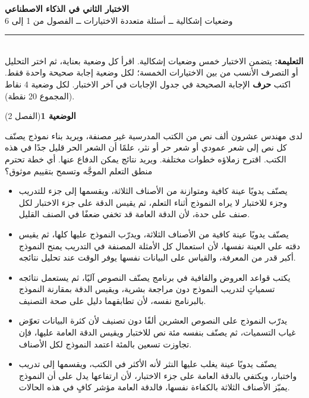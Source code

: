 \documentclass[11pt,a4paper]{article}
\begin{document}
\linespread{1.08}\selectfont
\begin{center}
{\LARGE\khatt\textbf{الاختبار الثاني في الذكاء الاصطناعي}}\\[4pt]
{\normalsize وضعيات إشكالية ــ أسئلة متعددة الاختيارات ــ الفصول من 1 إلى 6}
\end{center}
\vspace{-2pt}\rule{\textwidth}{0.6pt}\\[2pt]
\textbf{التعليمة:} يتضمن الاختبار خمس وضعيات إشكالية. اقرأ كل وضعية بعناية، ثم اختر التحليل أو التصرف الأنسب
من بين الاختيارات الخمسة؛ لكل وضعية إجابة صحيحة واحدة فقط.
اكتب \textbf{حرف} الإجابة الصحيحة في جدول الإجابات في آخر الاختبار.
لكل وضعية 4 نقاط (المجموع 20 نقطة).
\vspace{4pt}

\noindent
{\large\khatt\textbf{الوضعية 1}}\hfill{\small(الفصل 2)}\par\nopagebreak\vspace{3pt}
\setlength{\fboxsep}{7pt}\colorbox{gray!10}{\parbox{\dimexpr\linewidth-14pt}{لدى مهندس عشرون ألف نص من الكتب المدرسية غير مصنفة، ويريد بناء نموذج يصنّف كل نص إلى شعر عمودي أو شعر حر أو نثر، علمًا أن الشعر الحر قليل جدًا في هذه الكتب. اقترح زملاؤه خطوات مختلفة. ويريد نتائج يمكن الدفاع عنها. أي خطة تحترم منطق التعلم الموجَّه وتسمح بتقييم موثوق؟}}\par\nopagebreak
\begin{itemize}[leftmargin=1.0cm, labelsep=6pt, itemsep=3pt, topsep=4pt, parsep=0pt]
  \item[\textbf{أ)}] يصنّف يدويًا عينة كافية ومتوازنة من الأصناف الثلاثة، ويقسمها إلى جزء للتدريب وجزء للاختبار لا يراه النموذج أثناء التعلم، ثم يقيس الدقة على جزء الاختبار لكل صنف على حدة، لأن الدقة العامة قد تخفي ضعفًا في الصنف القليل.
  \item[\textbf{ب)}] يصنّف يدويًا عينة كافية من الأصناف الثلاثة، ويدرّب النموذج عليها كلها، ثم يقيس دقته على العينة نفسها، لأن استعمال كل الأمثلة المصنفة في التدريب يمنح النموذج أكبر قدر من المعرفة، والقياس على البيانات نفسها يوفر الوقت عند تحليل نتائجه.
  \item[\textbf{ج)}] يكتب قواعد العروض والقافية في برنامج يصنّف النصوص آليًا، ثم يستعمل نتائجه تسمياتٍ لتدريب النموذج دون مراجعة بشرية، ويقيس الدقة بمقارنة النموذج بالبرنامج نفسه، لأن تطابقهما دليل على صحة التصنيف.
  \item[\textbf{د)}] يدرّب النموذج على النصوص العشرين ألفًا دون تصنيف لأن كثرة البيانات تعوّض غياب التسميات، ثم يصنّف بنفسه مئة نص للاختبار ويقيس الدقة العامة عليها، فإن تجاوزت تسعين بالمئة اعتمد النموذج لكل الأصناف.
  \item[\textbf{هـ)}] يصنّف يدويًا عينة يغلب عليها النثر لأنه الأكثر في الكتب، ويقسمها إلى تدريب واختبار، ويكتفي بالدقة العامة على جزء الاختبار، لأن ارتفاعها يدل على أن النموذج يميّز الأصناف الثلاثة بالكفاءة نفسها، فالدقة العامة مؤشر كافٍ في هذه الحالات.
\end{itemize}
\end{document}
